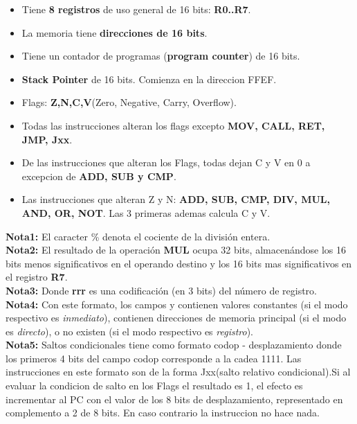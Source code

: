 \begin{itemize}
\item Tiene \textbf{8 registros} de uso general de 16 bits:\textbf{ R0..R7}.

\item La memoria tiene \textbf{direcciones de 16 bits}.

\item Tiene un contador de programas (\textbf{program counter}) de 16 bits.

\item \textbf{Stack Pointer} de 16 bits. Comienza en la direccion FFEF.

\item Flags: \textbf{Z,N,C,V}(Zero, Negative, Carry, Overflow).

\item Todas las instrucciones alteran los flags excepto \textbf{MOV, CALL, RET, JMP, Jxx}.

\item De las instrucciones que alteran los Flags, todas dejan C y V en 0 a excepcion de \textbf{ADD, SUB y CMP}.

\item Las instrucciones que alteran Z y N:\textbf{ ADD, SUB, CMP, DIV, MUL, AND, OR, NOT}. Las 3 primeras ademas calcula C y V.

\end{itemize}

\textbf{Nota1:} El caracter \% denota el cociente de la división entera.\\

\textbf{Nota2:} El resultado de la operación \textbf{MUL} ocupa 32 bits, almacenándose los 16 bits menos significativos en el operando destino y los 16 bits mas significativos en el registro \textbf{R7}.\\

\textbf{Nota3:} Donde \textbf{rrr} es una codificación (en 3 bits) del número de registro.\\

\textbf{Nota4:} Con este formato, los campos \code{\dest{}} y \code{\src{}} contienen valores constantes (si el modo respectivo es \textit{inmediato}), contienen direcciones de memoria principal (si el modo es \textit{directo}), o no existen (si el modo respectivo es \textit{registro}). \\

\textbf{Nota5:} Saltos condicionales tiene como formato codop - desplazamiento donde los primeros 4 bits del campo codop corresponde a la cadea 1111. Las instrucciones en este formato son de la forma Jxx(salto relativo condicional).Si al evaluar la condicion de salto en los Flags el resultado es 1, el efecto es incrementar al PC con el valor de los 8 bits de desplazamiento, representado en complemento a 2 de 8 bits. En caso contrario la instruccion no hace nada. \\

